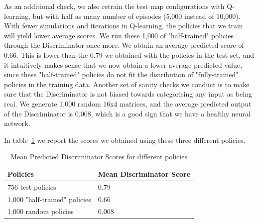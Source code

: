 
As an additional check, we also retrain the test map configurations with Q-learning, but with half as many number of episodes (5,000 instead of 10,000). With fewer simulations and iterations in Q-learning, the policies that we train will yield lower average scores. We run these 1,000 of "half-trained" policies through the Discriminator once more. We obtain an average predicted score of 0.66. This is lower than the 0.79 we obtained with the policies in the test set, and it intuitively makes sense that we now obtain a lower average predicted value, since these "half-trained" policies do not fit the distribution of "fully-trained" policies in the training data.
Another set of sanity checks we conduct is to make sure that the Discriminator is not biased towards categorising any input as being real. We generate 1,000 random 16x4 matrices, and the average predicted output of the Discriminator is 0.008, which is a good sign that we have a healthy neural network.

In table~\ref{table:discrim_scores} we report the scores we obtained using these three different policies.

\begin{table}[H]
\centering
\begin{tabular}{@{}ll@{}}
\toprule
Policies                      & Mean Discriminator Score \\ \midrule
756 test policies             & 0.79                               \\
1,000 "half-trained" policies & 0.66                               \\
1,000 random policies         & 0.008                              \\ \bottomrule
\end{tabular}
\caption{Mean Predicted Discriminator Scores for different policies}
\label{table:discrim_scores}
\end{table}